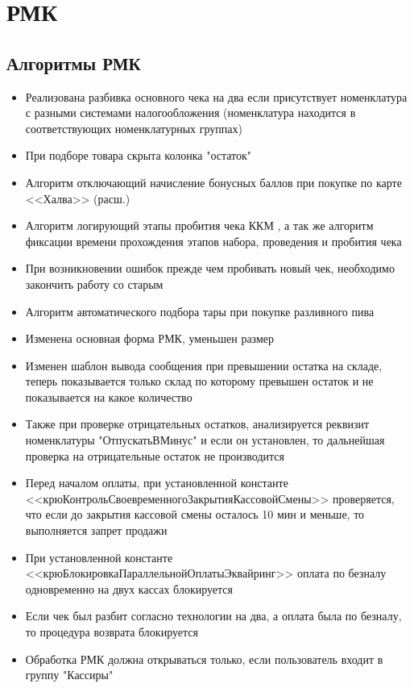 \section{РМК}
\subsection{Алгоритмы РМК}


\begin{itemize}
	\item Реализована разбивка основного чека на два если присутствует номенклатура с разными системами налогообложения  (номенклатура находится в соответствующих номенклатурных группах)
	\item При подборе товара скрыта колонка "остаток"
	\item  Алгоритм отключающий начисление бонусных баллов при покупке по карте <<Халва>> (расш.)
	\item Алгоритм логирующий этапы пробития чека ККМ , а так же алгоритм фиксации времени прохождения этапов набора, проведения и пробития чека
	\item При возникновении ошибок прежде чем пробивать новый чек, необходимо закончить работу со старым
	\item Алгоритм автоматического подбора тары при покупке разливного пива
	\item Изменена основная форма РМК, уменьшен размер
	\item Изменен шаблон вывода сообщения при превышении остатка на складе, теперь показывается только склад по которому превышен остаток и не показывается на какое количество
	\item Также при проверке отрицательных остатков, анализируется реквизит номенклатуры "ОтпускатьВМинус" и если он установлен, то дальнейшая проверка на отрицательные остаток не производится
	\item Перед началом оплаты, при установленной константе <<крюКонтрольСвоевременногоЗакрытияКассовойСмены>> проверяется, что если до закрытия кассовой смены осталось 10 мин и меньше, то выполняется запрет продажи
 	\item При установленной константе <<крюБлокировкаПараллельнойОплатыЭквайринг>> оплата по безналу одновременно на двух кассах блокируется
 	\item Если чек был разбит согласно технологии на два, а оплата была по безналу, то процедура возврата блокируется
 	\item Обработка РМК должна открываться только, если пользователь входит в группу "Кассиры"

\end{itemize}

